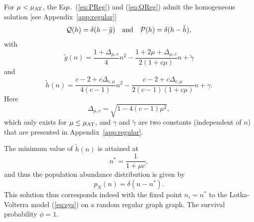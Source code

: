 \documentclass[11pt,a4paper]{article}
\begin{document}
For $\mu<\mu_{\rm AT}$, 
the Eqs.~(\ref{eq:PReg}) and (\ref{eq:QReg}) admit the homogeneous solution  [see Appendix~\ref{app:regular}]
\begin{equation}
\mathcal{Q}(h) = \delta(h-\tilde{g}) \quad {\rm and}  \quad \mathcal{P}(h) = \delta(h-\tilde{h}), \label{eq:regsol1}
\end{equation}
with 
\begin{equation}
\tilde{g}(n) =\frac{1+\Delta_{\mu, c}}{4} n^2 -  \frac{1+2\mu+ \Delta_{\mu,c}}{2(1+c\mu)}  n + \tilde{\gamma}   \label{eq:regsol2}
\end{equation}
and 
\begin{equation}
\tilde{h}(n) =   \frac{c-2+c\Delta_{c,\mu}}{4(c-1)}n^2 - \frac{c-2+c\Delta_{c,\mu}}{2(c-1)(1+c\mu)}n + \gamma.  \label{eq:regsol3}
\end{equation}
Here  
\begin{equation}
\Delta_{\mu,c} = \sqrt{1-4(c-1)\mu^2},  \label{eq:Delta}
\end{equation}
which only exists for $\mu\leq \mu_{\rm AT}$, and $\gamma$ and $\tilde{\gamma}$ are two constants (independent of $n$) that are presented in Appendix~\ref{app:regular}.  

The minimum value of $\tilde{h}(n)$ is attained at 
\begin{equation}
n^\ast = \frac{1}{1+\mu c},
\end{equation}
and thus the population abundance distribution is given by 
\begin{equation}
p_N(n) = \delta(n-n^\ast).
\end{equation}
This solution  thus  corresponds indeed with the fixed point  $n_i = n^\ast$ to the Lotka-Volterra model (\ref{eq:sys})  on a random regular graph graph.   The survival probability $\phi = 1$.  



 
\end{document}
